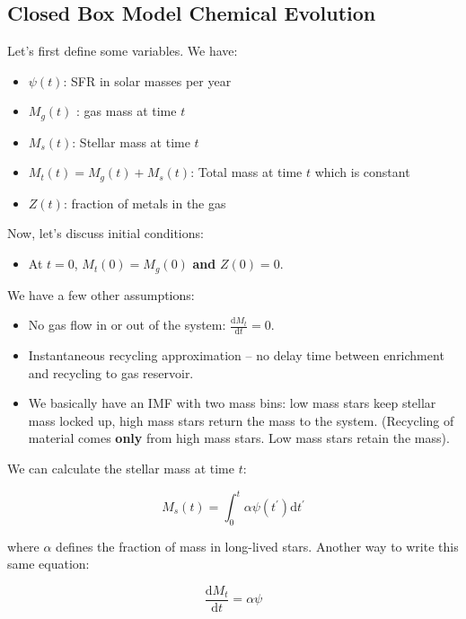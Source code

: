 \documentclass{article}
\begin{document}
\subsection{Closed Box Model Chemical Evolution}

Let's first define some variables. We have:

\begin{itemize}
    \item $\psi(t)$: SFR in solar masses per year
    \item $M_{g}(t)$ : gas mass at time $t$
    \item $M_s(t)$: Stellar mass at time $t$
    \item $M_t(t) = M_g(t) + M_s(t)$: Total mass at time $t$ which is constant
    \item $Z(t)$: fraction of metals in the gas
\end{itemize}

Now, let's discuss initial conditions:

\begin{itemize}
    \item At $t=0$, $M_t(0) = M_g(0)$ \textbf{and} $Z(0) = 0$.
\end{itemize}

We have a few other assumptions:

\begin{itemize}
    \item No gas flow in or out of the system: $\frac{\mathrm{d}M_t}{\mathrm{d}t} = 0$.
    \item Instantaneous recycling approximation -- no delay time between enrichment and recycling to gas reservoir. 
    \item We basically have an IMF with two mass bins: low mass stars keep stellar mass locked up, high mass stars return the mass to the system. (Recycling of material comes \textbf{only} from high mass stars. Low mass stars retain the mass).
\end{itemize}

We can calculate the stellar mass at time $t$:

\begin{equation}
    M_s(t) = \int_0^t \alpha \psi(t^\prime)\mathrm{d}t^\prime
\end{equation}

where $\alpha$ defines the fraction of mass in long-lived stars. Another way to write this same equation:

\begin{equation}
    \frac{\mathrm{d}M_t}{\mathrm{d}t} = \alpha \psi
\end{equation}
\end{document}
